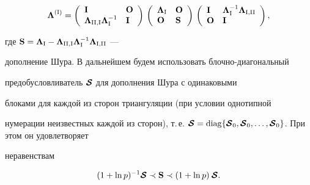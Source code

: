 \begin{equation*}




\bi \Lambda^{(\ri)}=\left(\begin{array}{ll}


\bold I & \bold O \\


\bi \Lambda_{\rii,\ri}\bi \Lambda_\ri^{-1} & \bold I


\end{array}\right)\,


\left(\begin{array}{ll}


\bi \Lambda_\ri & \bold O \\


\bold O & \bold S


\end{array}\right)\,


\left(\begin{array}{ll}


\bold I & \bi\Lambda_\ri^{-1}\bi\Lambda_{\ri,\rii} \\


\bold O & \bold I \end{array}\right),


\end{equation*}


где ${\bold S}={\bi \Lambda}_{\ri} - {\bi \Lambda}_{\rii,\ri}


{\bi\Lambda}_\ri^{-1}{\bi\Lambda}_{\ri,\rii}$ ---


дополнение Шура. В дальнейшем будем использовать блочно-диагональный 


предобусловливатель $\boldsymbol {\cal S}$ для дополнения Шура с одинаковыми 


блоками для каждой из сторон триангуляции (при условии однотипной 


нумерации неизвестных каждой из сторон), т.\,е. ${\bc S}=\diag \{ {\bc


S}_0, {\bc S}_0, \dotsc, {\bc S}_0\}$. При этом он удовлетворяет 


неравенствам


\begin{equation}\label{specshur}


(1+\ln p)^{-1} \bi{\cal S} \prec {\bold S}


\prec (1+\ln p) \: \bi{\cal S}.


\end{equation}






